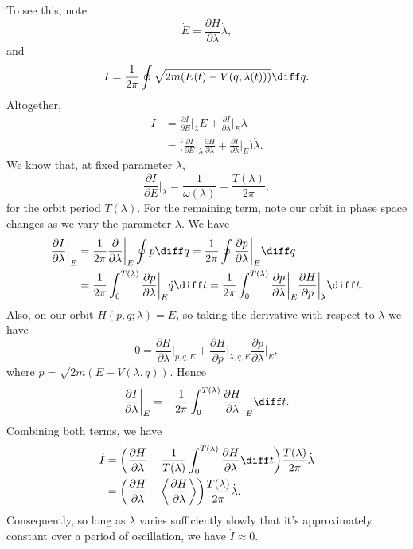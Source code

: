 \documentclass[12pt]{article}
\begin{document}
To see this, note
\[
\dot E = \frac{\partial H}{\partial \lambda} \dot \lambda,
\]
and
\[
	I = \frac{1}{2\pi} \oint \sqrt{2m(E(t) - V(q, \lambda(t)))} \diff q.
\]
Altogether,
\begin{align*}
	\dot I &= \frac{\partial I}{\partial E} \biggr|_{\lambda} \dot E + \frac{\partial I}{\partial \lambda} \biggr|_{E} \dot \lambda \\
	       &= \biggl( \frac{\partial I}{\partial E} \biggr|_{\lambda} \frac{\partial H}{\partial \lambda} + \frac{\partial I}{\partial \lambda} \biggr|_{E} \biggr) \dot \lambda.
\end{align*}
We know that, at fixed parameter $\lambda$,
\[
\frac{\partial I}{\partial E} \biggr|_{\lambda} = \frac{1}{\omega(\lambda)} = \frac{T(\lambda)}{2 \pi},
\]
for the orbit period $T(\lambda)$. For the remaining term, note our orbit in phase space changes as we vary the parameter $\lambda$. We have
\begin{align*}
	\frac{\partial I}{\partial \lambda} \biggr|_{E} &= \frac{1}{2\pi} \frac{\partial}{\partial \lambda} \biggr|_{E} \oint  p \diff q = \frac{1}{2 \pi} \oint \frac{\partial p}{\partial \lambda} \biggr|_E \diff q \\
							&= \frac{1}{2 \pi} \int_0^{T(\lambda)} \frac{\partial p}{\partial \lambda} \biggr|_E \dot q \diff t = \frac{1}{2\pi} \int_0^{T(\lambda)} \frac{\partial p}{\partial \lambda} \biggr|_E \frac{\partial H}{\partial p} \biggr|_\lambda \diff t.
\end{align*}
Also, on our orbit $H(p, q; \lambda) = E$, so taking the derivative with respect to $\lambda$ we have
\[
0 = \frac{\partial H}{\partial \lambda} \biggr|_{p, q, E} + \frac{\partial H}{\partial p} \biggr|_{\lambda, q, E} \frac{\partial p}{\partial \lambda} \biggr|_E,
\]
where $p = \sqrt{2m(E - V(\lambda, q))}$. Hence
\[
\frac{\partial I}{\partial \lambda} \biggr|_E = - \frac{1}{2 \pi} \int_0^{T(\lambda)} \frac{\partial H}{\partial \lambda} \biggr|_E \diff t.
\]
Combining both terms, we have
\begin{align*}
	\dot I &= \biggl( \frac{\partial H}{\partial \lambda} - \frac{1}{T(\lambda)} \int_0^{T(\lambda)} \frac{\partial H}{\partial \lambda} \diff t \biggr) \frac{T(\lambda)}{2\pi} \dot \lambda \\
	       &= \biggl( \frac{\partial H}{\partial \lambda} - \biggl\langle \frac{\partial H}{\partial \lambda} \biggr\rangle \biggr) \frac{T(\lambda)}{2 \pi} \dot \lambda.
\end{align*}
Consequently, so long as $\lambda$ varies sufficiently slowly that it's approximately constant over a period of oscillation, we have $\dot I \approx 0$.
\end{document}
